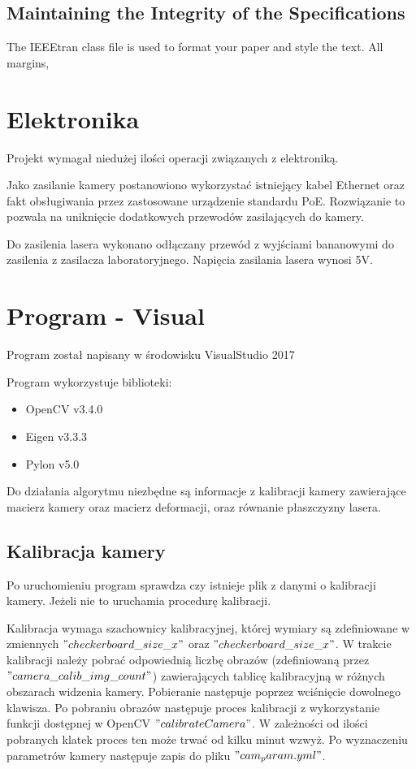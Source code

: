 \documentclass[conference]{IEEEtran}
\begin{document}
\subsection{Maintaining the Integrity of the Specifications}

The IEEEtran class file is used to format your paper and style the text. All margins, 

\section{Elektronika}
Projekt wymagał niedużej ilości operacji związanych z elektroniką.

Jako zasilanie kamery postanowiono wykorzystać istniejący kabel Ethernet oraz fakt obsługiwania przez zastosowane urządzenie standardu PoE. Rozwiązanie to pozwala na uniknięcie dodatkowych przewodów zasilających do kamery.

Do zasilenia lasera wykonano odłączany przewód z wyjściami bananowymi do zasilenia z zasilacza laboratoryjnego. Napięcia zasilania lasera wynosi 5V.

\section{Program - Visual}

Program został napisany w środowisku VisualStudio 2017

Program wykorzystuje biblioteki:
\begin{itemize}
\item OpenCV v3.4.0
\item Eigen v3.3.3
\item Pylon v5.0
\end{itemize}

Do działania algorytmu niezbędne są informacje z kalibracji kamery zawierające macierz kamery oraz macierz deformacji, oraz równanie płaszczyzny lasera.

\subsection{Kalibracja kamery}

Po uruchomieniu program sprawdza czy istnieje plik z danymi o kalibracji kamery. Jeżeli nie to uruchamia procedurę kalibracji. 

Kalibracja wymaga szachownicy kalibracyjnej, której wymiary są zdefiniowane w zmiennych $"checkerboard\_size\_x"$ oraz $"checkerboard\_size\_x"$. W trakcie kalibracji należy pobrać odpowiednią liczbę obrazów (zdefiniowaną przez $"camera\_calib\_img\_count"$) zawierających tablicę kalibracyjną w różnych obszarach widzenia kamery. Pobieranie następuje poprzez wciśnięcie dowolnego klawisza. Po pobraniu obrazów następuje proces kalibracji z wykorzystanie funkcji dostępnej w OpenCV $"calibrateCamera"$. W zależności od ilości pobranych klatek proces ten może trwać od kilku minut wzwyż. Po wyznaczeniu parametrów kamery następuje zapis do pliku $"cam_param.yml"$.
\end{document}

